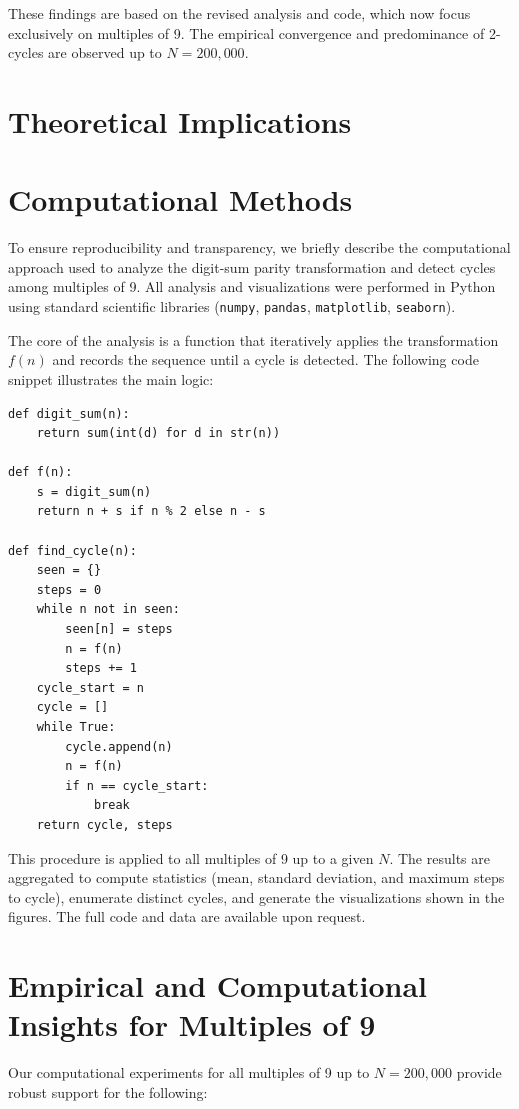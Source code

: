 \documentclass[12pt]{article}
\begin{document}
These findings are based on the revised analysis and code, which now focus exclusively on multiples of 9. The empirical convergence and predominance of 2-cycles are observed up to $N=200,000$.

\section{Theoretical Implications}

\section{Computational Methods}
To ensure reproducibility and transparency, we briefly describe the computational approach used to analyze the digit-sum parity transformation and detect cycles among multiples of 9. All analysis and visualizations were performed in Python using standard scientific libraries (\texttt{numpy}, \texttt{pandas}, \texttt{matplotlib}, \texttt{seaborn}).

The core of the analysis is a function that iteratively applies the transformation $f(n)$ and records the sequence until a cycle is detected. The following code snippet illustrates the main logic:

\begin{verbatim}
def digit_sum(n):
    return sum(int(d) for d in str(n))

def f(n):
    s = digit_sum(n)
    return n + s if n % 2 else n - s

def find_cycle(n):
    seen = {}
    steps = 0
    while n not in seen:
        seen[n] = steps
        n = f(n)
        steps += 1
    cycle_start = n
    cycle = []
    while True:
        cycle.append(n)
        n = f(n)
        if n == cycle_start:
            break
    return cycle, steps
\end{verbatim}

This procedure is applied to all multiples of 9 up to a given $N$. The results are aggregated to compute statistics (mean, standard deviation, and maximum steps to cycle), enumerate distinct cycles, and generate the visualizations shown in the figures. The full code and data are available upon request.

\section{Empirical and Computational Insights for Multiples of 9}

Our computational experiments for all multiples of 9 up to $N=200,000$ provide robust support for the following:
\end{document}
